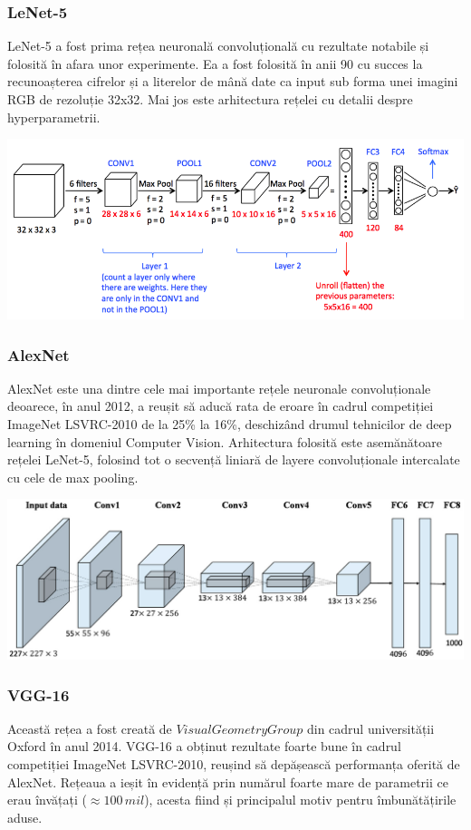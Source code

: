 \subsubsection{LeNet-5}
LeNet-5 a fost prima rețea neuronală convoluțională cu rezultate notabile și folosită în afara unor experimente. Ea a fost folosită în anii 90 cu succes la recunoașterea cifrelor și a literelor de mână date ca input sub forma unei imagini RGB de rezoluție 32x32. Mai jos este arhitectura rețelei cu detalii despre hyperparametrii.

\begin{center}
\includegraphics[scale=0.5]{LeNet5}
\end{center}

\subsubsection{AlexNet}
AlexNet este una dintre cele mai importante rețele neuronale convoluționale deoarece, în anul 2012, a reușit să aducă rata de eroare în cadrul competiției ImageNet LSVRC-2010 de la 25\% la 16\%, deschizând drumul tehnicilor de deep learning în domeniul Computer Vision. Arhitectura folosită este asemănătoare rețelei LeNet-5, folosind tot o secvență liniară de layere convoluționale intercalate cu cele de max pooling.

\begin{center}
\includegraphics[scale=1.5]{alexnet}
\end{center}

\subsubsection{VGG-16}
Această rețea a fost creată de $Visual Geometry Group$ din cadrul universității Oxford în anul 2014. VGG-16 a obținut rezultate foarte bune în cadrul competiției ImageNet LSVRC-2010, reușind să depășească performanța oferită de AlexNet. Rețeaua a ieșit în evidență prin numărul foarte mare de parametrii ce erau învățați ($\approx 100 \, mil$), acesta fiind și principalul motiv pentru îmbunătățirile aduse.

